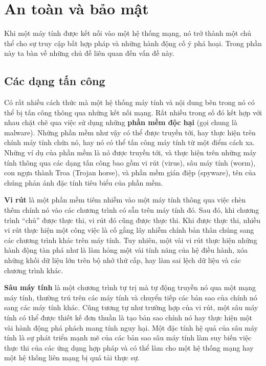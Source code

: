 \section{An toàn và bảo mật}
\label{sec:4.5}
Khi một máy tính được kết nối vào một hệ thống mạng, nó trở thành một chủ thể cho sự truy
cập bất hợp pháp và những hành động cố ý phá hoại. Trong phần này ta bàn về những
chủ đề liên quan đến vấn đề này.

\subsection*{Các dạng tấn công}

Có rất nhiều cách thức mà một hệ thống máy tính và nội dung bên trong nó có thể bị tấn
công thông qua những kết nối mạng. Rất nhiều trong số đó kết hợp với nhau chặt chẽ qua
việc sử dụng những \textbf{phần mềm độc hại} (gọi chung là malware). Những phần mềm như
vậy có thể được truyền tới, hay thực hiện trên chính máy tính chứa nó, hay nó có thể tấn
công máy tính từ một điểm cách xa. Những ví dụ của phần mềm là nó được truyền tới, và thực
hiện trên những máy tính thông qua các dạng tấn công bao gồm vi rút (virus), sâu máy tính
(worm), con ngựa thành Troa (Trojan horse), và phần mềm gián điệp (spyware), tên của chúng
phản ánh đặc tính tiêu biểu của phần mềm.

\textbf{Vi rút} là một phần mềm tiêm nhiễm vào một máy tính thông qua việc chèn thêm chính
nó vào các chương trình có sẵn trên máy tính đó. Sau đó, khi chương trình ``chủ'' được
thực thi, vi rút đó cũng được thực thi. Khi được thực thi, nhiều vi rút thực hiện một công
việc là cố gắng lây nhiễm chính bản thân chúng sang các chương trình khác trên máy
tính. Tuy nhiên, một vài vi rút thực hiện những hành động tàn phá như là làm hỏng một vài
tính năng của hệ điều hành, xóa những khối dữ liệu lớn trên bộ nhớ thứ cấp, hay làm sai
lệch dữ liệu và các chương trình khác.

\textbf{Sâu máy tính} là một chương trình tự trị mà tự động truyền nó qua một mạng máy
tính, thường trú trên các máy tính và chuyển tiếp các bản sao của chính nó sang các máy
tính khác. Cũng tương tự như trường hợp của vi rút, một sâu máy tính có thể được thiết kế
đơn thuần là tạo bản sao chính nó hay thực hiện một vài hành động phá phách mang tính nguy
hại. Một đặc tính hệ quả của sâu máy tính là sự phát triển mạnh mẽ của các bản sao sâu máy
tính làm suy biến việc thực thi của các ứng dụng hợp pháp và có thể làm cho một hệ thống
mạng hay một hệ thống liên mạng bị quá tải thực sự.

